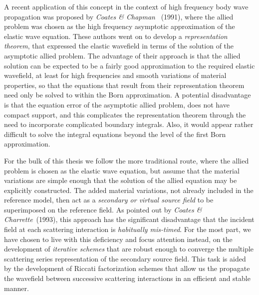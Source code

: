 A recent application of this concept in the context of high 
frequency body wave propagation was proposed by {\em  Coates \& Chapman\/} 
~(1991), where the allied problem was chosen as the high frequency 
asymptotic approximation of the elastic wave equation. These authors went 
on to develop a {\em representation theorem\/}, that expressed the elastic 
wavefield in terms of the solution of the asymptotic allied problem. The 
advantage of their approach is that the allied solution can be expected 
to be a fairly good approximation to the required elastic wavefield, at 
least for high frequencies and smooth variations of material properties,
 so that the equations that result from their 
representation theorem need only be solved to within the Born approximation.
A potential disadvantage is that the equation error of the 
asymptotic allied problem, does not have compact support, and this 
complicates the representation theorem through the need to incorporate 
complicated boundary integrals. Also, it would appear rather difficult to 
solve the integral equations beyond the level of the first Born 
approximation.

For the bulk of this thesis we follow the more traditional route, where the allied 
problem is chosen as the elastic wave equation, but assume that the 
material variations are simple enough that the solution of the allied 
equation may be explicitly constructed. The added material variations, 
not already included in the reference model, then act as a {\em secondary 
or virtual source field\/} to be superimposed on the reference field. As 
pointed out by {\em Coates \& Charrette\/}~(1993), this approach has the 
significant disadvantage that the incident field at each scattering 
interaction is {\em habitually mis-timed\/}. For the most part, we have chosen to 
live with this deficiency and focus attention instead,   on the development of 
{\em iterative schemes\/} that are robust enough to converge the multiple 
scattering series representation of the secondary source field. This task 
is aided by the development of Riccati factorization schemes that 
allow us the propagate the wavefield between successive scattering 
interactions in an efficient and stable manner. 

